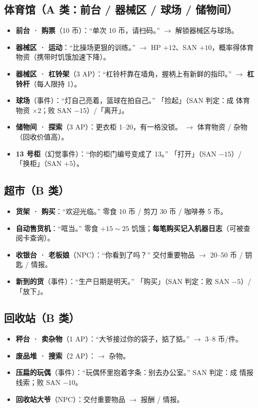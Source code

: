 \documentclass[UTF8, fontset=none, 11pt]{ctexart}
\begin{document}
\subsection{体育馆（A 类：前台 / 器械区 / 球场 / 储物间）}
\begin{itemize}
  \item \textbf{前台 · 购票}（10 币）：``单次 10 币，请扫码。'' $\to$ 解锁器械区与球场。
  \item \textbf{器械区 · 运动}：``比操场更狠的训练。'' $\to$ HP $+12$、SAN $+10$，概率得体育物资（携带时饥饿加速下降）。
  \item \textbf{器械区 · 杠铃架}（3 AP）：``杠铃杆靠在墙角，握柄上有新鲜的指印。'' $\to$ \textbf{杠铃杆}（每人限持 1）。
  \item \textbf{球场}（事件）：``灯自己亮着，篮球在拍自己。'' 「捡起」（SAN 判定：成 体育物资 $\times 2$；败 SAN $-15$）/「离开」。
  \item \textbf{储物间 · 探索}（3 AP）：更衣柜 1--20，有一格没锁。 $\to$ 体育物资 / 杂物（回收价值高）。
  \item \textbf{13 号柜}（幻觉事件）：``你的柜门编号变成了 13。'' 「打开」（SAN $-15$）/「换柜」（SAN $+5$）。
\end{itemize}

\subsection{超市（B 类）}
\begin{itemize}
  \item \textbf{货架 · 购买}：``欢迎光临。'' 零食 10 币 / 剪刀 30 币 / 咖啡券 5 币。
  \item \textbf{自动售货机}：``哐当。'' 零食 $+15\sim25$ 饥饿；\textbf{每笔购买记入机器日志}（可被查阅卡查询）。
  \item \textbf{收银台 · 老板娘}（NPC）：``你看到了吗？'' 交付重要物品 $\to$ 20--50 币 / 钥匙 / 情报。
  \item \textbf{新到的货}（事件）：``生产日期是明天。'' 「购买」（SAN 判定：败 SAN $-5$）/「放下」。
\end{itemize}

\subsection{回收站（B 类）}
\begin{itemize}
  \item \textbf{秤台 · 卖杂物}（1 AP）：``大爷接过你的袋子，掂了掂。'' $\to$ 3--8 币/件。
  \item \textbf{废品堆 · 搜索}（2 AP）：$\to$ 杂物。
  \item \textbf{压扁的玩偶}（事件）：``玩偶怀里抱着字条：别去办公室。'' SAN 判定：成 情报线索；败 SAN $-10$。
  \item \textbf{回收站大爷}（NPC）：交付重要物品 $\to$ 报酬 / 情报。
\end{itemize}
\end{document}
